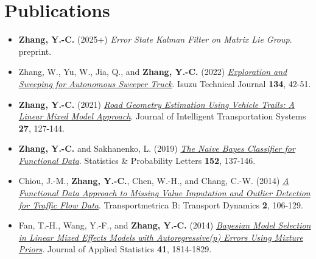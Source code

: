 \documentclass[a4paper,10pt,dvipdfmx]{article}
\begin{document}
\section*{Publications}
\begin{itemize}[noitemsep,nolistsep]
  \item[1.] \textbf{Zhang, Y.-C.} (2025+) \textit{Error State Kalman Filter on Matrix Lie Group}. preprint.
  \item[2.] Zhang, W., Yu, W., Jia, Q., and \textbf{Zhang, Y.-C.} (2022) \href{https://chris7462.github.io/Sweeping.pdf}{\textit{Exploration and Sweeping for Autonomous Sweeper Truck}}. Isuzu Technical Journal \textbf{134}, 42-51.
  \item[3.] \textbf{Zhang, Y.-C.} (2021) \href{https://www.tandfonline.com/doi/full/10.1080/15472450.2021.1974858}{\textit{Road Geometry Estimation Using Vehicle Trails: A Linear Mixed Model Approach}}. Journal of Intelligent Transportation Systems \textbf{27}, 127-144.
  \item[4.] \textbf{Zhang, Y.-C.} and Sakhanenko, L. (2019) \href{https://www.sciencedirect.com/science/article/pii/S0167715219301208}{\textit{The Naive Bayes Classifier for Functional Data}}. Statistics \& Probability Letters \textbf{152}, 137-146.
  \item[5.] Chiou, J.-M., \textbf{Zhang, Y.-C.}, Chen, W.-H., and Chang, C.-W. (2014) \href{http://www.tandfonline.com/doi/abs/10.1080/21680566.2014.892847}{\textit{A Functional Data Approach to Missing Value Imputation and Outlier Detection for Traffic Flow Data}}. Transportmetrica B: Transport Dynamics \textbf{2}, 106-129.
  \item[6.] Fan, T.-H., Wang, Y.-F., and \textbf{Zhang, Y.-C.} (2014) \href{http://www.tandfonline.com/doi/abs/10.1080/02664763.2014.894001}{\textit{Bayesian Model Selection in Linear Mixed Effects Models with Autoregressive(p) Errors Using Mixture Priors}}. Journal of Applied Statistics \textbf{41}, 1814-1829.
\end{itemize}
\end{document}
